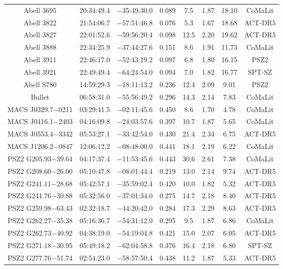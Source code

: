 \begin{table}
\begin{tabular}{cccccccc}
Abell 3695 & 20:34:49.4 & $-$35:49:30.0 & 0.089 & 7.5 & 1.87 & 18.10 & CoMaLit \\
Abell 3822 & 21:54:06.7 & $-$57:51:46.8 & 0.076 & 5.3 & 1.67 & 18.68 & ACT-DR5 \\
Abell 3827 & 22:01:52.6 & $-$59:56:20.4 & 0.098 & 12.5 & 2.20 & 19.62 & ACT-DR5 \\
Abell 3888 & 22:34:25.9 & $-$37:44:27.6 & 0.151 & 8.6 & 1.91 & 11.73 & CoMaLit \\
Abell 3911 & 22:46:17.0 & $-$52:43:19.2 & 0.097 & 6.8 & 1.80 & 16.15 & PSZ2 \\
Abell 3921 & 22:49:49.4 & $-$64:24:54.0 & 0.094 & 7.0 & 1.82 & 16.77 & SPT-SZ \\
Abell S780 & 14:59:29.3 & $-$18:11:13.2 & 0.236 & 12.4 & 2.09 & 9.01 & PSZ2 \\
Bullet & 06:58:31.0 & $-$55:56:49.2 & 0.296 & 14.3 & 2.14 & 7.83 & CoMaLit \\
MACS J0329.7$-$0211 & 03:29:41.5 & $-$02:11:45.6 & 0.450 & 8.6 & 1.70 & 4.78 & CoMaLit \\
MACS J0416.1$-$2403 & 04:16:09.8 & $-$24:03:57.6 & 0.397 & 10.7 & 1.87 & 5.65 & CoMaLit \\
MACS J0553.4$-$3342 & 05:53:27.1 & $-$33:42:54.0 & 0.430 & 21.4 & 2.34 & 6.75 & ACT-DR5 \\
MACS J1206.2$-$0847 & 12:06:12.2 & $-$08:48:00.0 & 0.441 & 18.1 & 2.19 & 6.22 & CoMaLit \\
PSZ2 G205.93$-$39.64 & 04:17:37.4 & $-$11:53:45.6 & 0.443 & 30.6 & 2.61 & 7.38 & CoMaLit \\
PSZ2 G208.60$-$26.00 & 05:10:47.8 & $-$08:01:44.4 & 0.219 & 13.0 & 2.14 & 9.74 & ACT-DR5 \\
PSZ2 G241.11$-$28.68 & 05:42:57.1 & $-$35:59:02.4 & 0.420 & 10.0 & 1.82 & 5.32 & ACT-DR5 \\
PSZ2 G241.76$-$30.88 & 05:32:56.0 & $-$37:01:34.0 & 0.275 & 14.7 & 2.18 & 8.40 & ACT-DR5 \\
PSZ2 G259.98$-$63.43 & 02:32:18.7 & $-$44:20:42.0 & 0.284 & 17.3 & 2.29 & 8.63 & ACT-DR5 \\
PSZ2 G262.27$-$35.38 & 05:16:36.7 & $-$54:31:12.0 & 0.295 & 9.5 & 1.87 & 6.86 & CoMaLit \\
PSZ2 G262.73$-$40.92 & 04:38:19.0 & $-$54:19:04.8 & 0.421 & 15.0 & 2.07 & 6.05 & ACT-DR5 \\
PSZ2 G271.18$-$30.95 & 05:49:18.2 & $-$62:04:58.8 & 0.376 & 16.4 & 2.18 & 6.80 & SPT-SZ \\
PSZ2 G277.76$-$51.74 & 02:54:23.0 & $-$58:57:50.4 & 0.438 & 11.2 & 1.87 & 5.33 & ACT-DR5 \\

\end{tabular}
\end{table}
